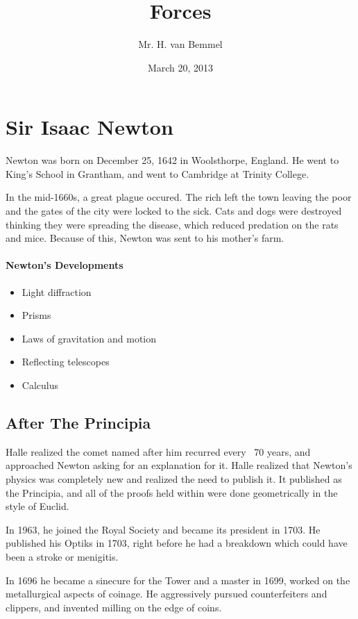\documentclass[letterpaper, 12pt]{article}
\begin{document}
\title{Forces}
\author{Mr. H. van Bemmel}
\date{March 20, 2013}
\maketitle


\section{Sir Isaac Newton}
Newton was born on December 25, 1642 in Woolsthorpe, England. He went to King's School
in Grantham, and went to Cambridge at Trinity College.

In the mid-1660s, a great plague occured. The rich left the town leaving the
poor and the gates of the city were locked to the sick. Cats and dogs were destroyed
thinking they were spreading the disease, which reduced predation on the rats and mice.
Because of this, Newton was sent to his mother's farm.
\paragraph*{Newton's Developments}
\begin{itemize}
    \item Light diffraction
    \item Prisms
    \item Laws of gravitation and motion
    \item Reflecting telescopes
    \item Calculus
\end{itemize}
\subsection{After The Principia}
Halle realized the comet named after him recurred every ~70 years, and approached
Newton asking for an explanation for it. Halle realized that Newton's physics
was completely new and realized the need to publish it. It published as
the Principia, and all of the proofs held within were done geometrically
in the style of Euclid.

In 1963, he joined the Royal Society and became its president in 1703.
He published his Optiks in 1703, right before he had a breakdown which could
have been a stroke or menigitis.

In 1696 he became a sinecure for the Tower and a master in 1699, worked on the
metallurgical aspects of coinage. He aggressively pursued counterfeiters
and clippers, and invented milling on the edge of coins.
\end{document}
